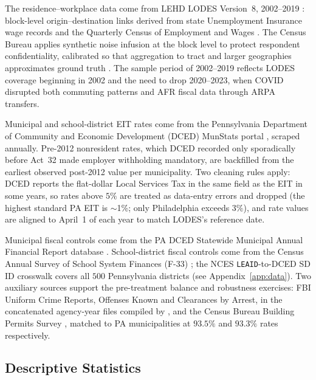 \documentclass[12pt]{article}
\begin{document}
The residence--workplace data come from LEHD LODES Version~8,
2002--2019 \citep{lehdLODES}: block-level origin--destination links
derived from state Unemployment Insurance wage records and the
Quarterly Census of Employment and Wages
\citep{abowdProducerDynamicsNew2009}. The Census Bureau applies
synthetic noise infusion at the block level to protect respondent
confidentiality, calibrated so that aggregation to tract and larger
geographies approximates ground truth
\citep{grahamDESIGNCOMPARISONLODES}. The sample period of 2002--2019
reflects LODES coverage beginning in 2002 and the need to drop
2020--2023, when COVID disrupted both commuting patterns and AFR
fiscal data through ARPA transfers.

Municipal and school-district EIT rates come from the Pennsylvania
Department of Community and Economic Development (DCED) MunStats
portal \citep{padcedMunStats}, scraped annually. Pre-2012 nonresident
rates, which DCED recorded only sporadically before Act~32 made
employer withholding mandatory, are backfilled from the earliest
observed post-2012 value per municipality. Two cleaning rules apply:
DCED reports the flat-dollar Local Services Tax in the same field
as the EIT in some years, so rates above $5\%$ are treated as
data-entry errors and dropped (the highest standard PA EIT is
$\sim$1\%; only Philadelphia exceeds $3\%$), and rate values are
aligned to April~1 of each year to match LODES's reference date.

Municipal fiscal controls come from the PA DCED Statewide Municipal
Annual Financial Report database \citep{padcedAFR}. School-district
fiscal controls come from the Census Annual Survey of School System
Finances (F-33) \citep{censusF33}; the NCES \texttt{LEAID}-to-DCED
SD ID crosswalk covers all $500$ Pennsylvania districts
(see Appendix~\ref{app:data}). Two auxiliary sources support the
pre-treatment balance and robustness exercises: FBI Uniform Crime
Reports, Offenses Known and Clearances by Arrest, in the
concatenated agency-year files compiled by \citet{kaplanUCR}, and
the Census Bureau Building Permits Survey \citep{censusBPS}, matched
to PA municipalities at $93.5\%$ and $93.3\%$ rates respectively.

\subsection{Descriptive Statistics}
\label{subsec:descriptive}
\end{document}
